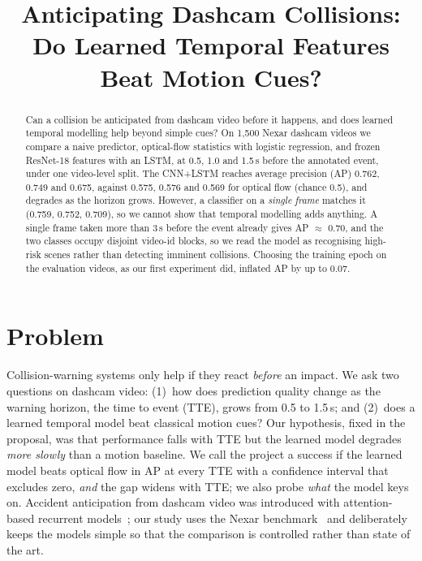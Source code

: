 \documentclass[conference]{IEEEtran}
\begin{document}
\title{Anticipating Dashcam Collisions: Do Learned Temporal Features Beat Motion Cues?}

\author{
}

\maketitle

\begin{abstract}
Can a collision be anticipated from dashcam video before it happens, and does learned temporal modelling help beyond simple cues?
On 1,500 Nexar dashcam videos we compare a naive predictor, optical-flow statistics with logistic regression, and frozen ResNet-18 features with an LSTM,
at 0.5, 1.0 and 1.5\,s before the annotated event, under one video-level split.
The CNN+LSTM reaches average precision (AP) 0.762, 0.749 and 0.675, against 0.575, 0.576 and 0.569 for optical flow (chance 0.5), and degrades as the horizon grows.
However, a classifier on a \emph{single frame} matches it (0.759, 0.752, 0.709), so we cannot show that temporal modelling adds anything.
A single frame taken more than 3\,s before the event already gives AP $\approx$ 0.70, and the two classes occupy disjoint video-id blocks,
so we read the model as recognising high-risk scenes rather than detecting imminent collisions.
Choosing the training epoch on the evaluation videos, as our first experiment did, inflated AP by up to 0.07.
\end{abstract}

\section{Problem}
Collision-warning systems only help if they react \emph{before} an impact. We ask two questions on dashcam video:
(1)~how does prediction quality change as the warning horizon, the time to event (TTE), grows from 0.5 to 1.5\,s; and
(2)~does a learned temporal model beat classical motion cues? Our hypothesis, fixed in the proposal, was that performance falls with TTE but the learned model degrades \emph{more slowly}
than a motion baseline. We call the project a success if the learned model beats optical flow in AP at every TTE with a confidence interval that excludes zero, \emph{and} the gap widens with TTE;
we also probe \emph{what} the model keys on.
Accident anticipation from dashcam video was introduced with attention-based recurrent models~\cite{chan2016anticipating}; our study uses the Nexar benchmark~\cite{moura2025nexar}
and deliberately keeps the models simple so that the comparison is controlled rather than state of the art.
\end{document}

